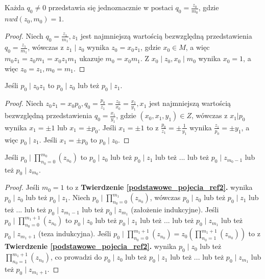 \begin{appendices}
\begin{theorem}
Każda $q_0 \neq 0$ przedstawia się jednoznacznie w postaci $q_0 = \frac{z_0}{m_0}$, gdzie $nwd(z_0, m_0) = 1$.
\begin{proof}
Niech $q_0 = \frac{z_1}{m_1}, z_1$ jest najmniejszą wartością bezwzględną przedstawienia $q_0 = \frac{z_1}{m_1}$, wówczas z $z_1 \mid z_0$ wynika $z_0 = x_0z_1$, gdzie $x_0 \in M$, a więc $m_0z_1 = z_0m_1 = x_0z_1m_1$ ukazuje $m_0 = x_0m_1$. Z $x_0 \mid z_0, x_0 \mid m_0$ wynika $x_0 = 1$, a więc $z_0 = z_1, m_0 = m_1$.
\end{proof}
\end{theorem}
\begin{theorem}
Jeśli $p_0 \mid z_0z_1$ to $p_0 \mid z_0$ lub też $p_0 \mid z_1$.
\begin{proof}
Niech $z_0z_1 = x_0p_0, q_0 = \frac{p_0}{z_1} = \frac{z_0}{x_0} = \frac{x_1}{y_1}, x_1$ jest najmniejszą wartością bezwzględną przedstawienia $q_0 = \frac{x_1}{y_1}$, gdzie $(x_0, x_1, y_1) \in Z$, wówczas z $x_1 | p_0$ wynika $x_1 = \pm 1$ lub $x_1 = \pm p_0$. Jeśli $x_1 = \pm 1$ to z $\frac{p_0}{z_1} = \pm \frac{1}{y_1}$ wynika $\frac{z_1}{p_0} = \pm y_1$, a więc $p_0 \mid z_1$. Jeśli $x_1 = \pm p_0$ to $p_0 \mid z_0$.
\end{proof}
\end{theorem}
\begin{theorem}
Jeśli $p_0 \mid \prod_{n_0 = 0}^{m_0}(z_{n_0})$ to $p_0 \mid z_0$ lub też $p_0 \mid z_1$ lub też ... lub też $p_0 \mid z_{m_0 - 1}$ lub też $p_0 \mid z_{m_0}$.
\begin{proof}
Jeśli $m_0 = 1$ to z \textbf{Twierdzenie \ref{podstawowe_pojecia_ref2}.} wynika $p_0 \mid z_0$ lub też $p_0 \mid z_1$. Niech $p_0 \mid \prod_{n_0 = 0}^{m_1}(z_{n_0})$, wówczas $p_0 \mid z_0$ lub też $p_0 \mid z_1$ lub też ... lub też $p_0 \mid z_{m_1 - 1}$ lub też $p_0 \mid z_{m_1}$ (założenie indukcyjne). Jeśli $p_0 \mid \prod_{n_0 = 0}^{m_1 + 1}(z_{n_0})$ to $p_0 \mid z_0$ lub też $p_0 \mid z_1$ lub też ... lub też $p_0 \mid z_{m_1}$ lub też $p_0 \mid z_{m_1 + 1}$ (teza indukcyjna). Jeśli $p_0 \mid \prod_{n_0 = 0}^{m_1 + 1}(z_{n_0}) = z_0(\prod_{n_0 = 1}^{m_1 + 1}(z_{n_0}))$ to z \textbf{Twierdzenie \ref{podstawowe_pojecia_ref2}.} wynika $p_0 \mid z_0$ lub też $\prod_{n_0 = 1}^{m_1 + 1}(z_{n_0})$, co prowadzi do $p_0 \mid z_0$ lub też $p_0 \mid z_1$ lub też ... lub też $p_0 \mid z_{m_1}$ lub też $p_0 \mid z_{m_1 + 1}$.

\end{proof}
\end{theorem}
\end{appendices}
